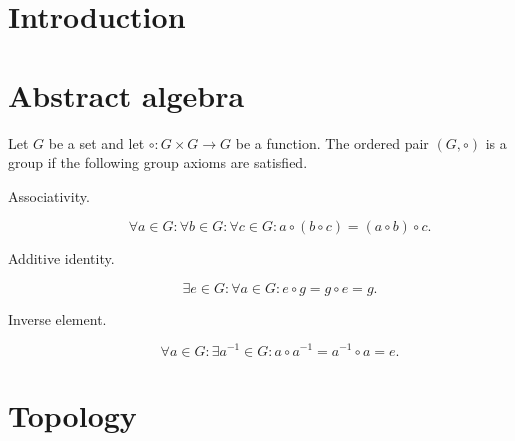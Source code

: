 \documentclass[../../main.tex]{subfiles}
\begin{document}
\section*{Introduction}

\section{Abstract algebra}
\begin{definition}[Group]
    Let $G$ be a set and let $\circ:G\times G\to G$ be a function. The ordered pair $(G,\circ)$ is a group if the following group axioms are satisfied.
    \begin{description}
        \item[Associativity.]
        \begin{equation*}
            \forall a\in G:\forall b\in G:\forall c\in G:a\circ(b\circ c)=(a\circ b)\circ c.
        \end{equation*}
        \item[Additive identity.]
        \begin{equation*}
            \exists e\in G:\forall a\in G:e\circ g=g\circ e=g.
        \end{equation*}
        \item[Inverse element.]
        \begin{equation*}
            \forall a\in G:\exists a^{-1}\in G:a\circ a^{-1}=a^{-1}\circ a=e.
        \end{equation*}
    \end{description}
\end{definition}

\section{Topology}
\end{document}
